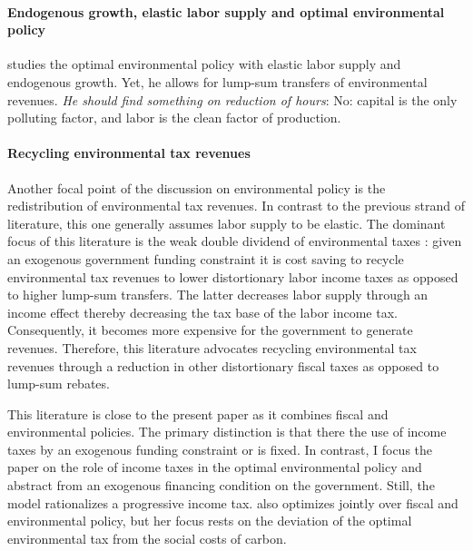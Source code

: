 \paragraph{Endogenous growth, elastic labor supply and optimal environmental policy}
\cite{Hemous2021DirectedEconomics}
\cite{Oueslati2002EnvironmentalSupply} studies the optimal environmental policy with elastic labor supply and endogenous growth. Yet, he allows for lump-sum transfers of environmental revenues. \textit{He should find something on reduction of hours}: No: capital is the only polluting factor, and labor is the clean factor of production.


\paragraph{Recycling environmental tax revenues}
Another focal point of the discussion on environmental policy is the redistribution of environmental tax revenues. In contrast to the previous strand of literature, this one generally assumes labor supply to be elastic. 
The dominant focus of this literature is the weak double dividend of environmental taxes \citep{Goulder1995EnvironmentalGuide, Bovenberg2002EnvironmentalRegulation}: given an exogenous government funding constraint it is cost saving to recycle environmental tax revenues to lower distortionary labor income taxes as opposed to higher lump-sum transfers. The latter decreases labor supply through an income effect thereby decreasing the tax base of the labor income tax. Consequently, it becomes more expensive for the government to generate revenues.
Therefore, this literature advocates recycling environmental tax revenues through a reduction in other distortionary fiscal taxes as opposed to lump-sum rebates.

This literature is close to the present paper as it combines fiscal and environmental policies.  The primary distinction is that there the use of income taxes by an exogenous funding constraint or is fixed. In contrast, I focus the paper on the role of income taxes in the optimal environmental policy and abstract from an exogenous financing condition on the government. Still, the model rationalizes a progressive income tax.
\cite{Barrage2019OptimalPolicy} also optimizes jointly over fiscal and environmental policy, but her focus rests on the deviation of the optimal environmental tax from the social costs of carbon.

